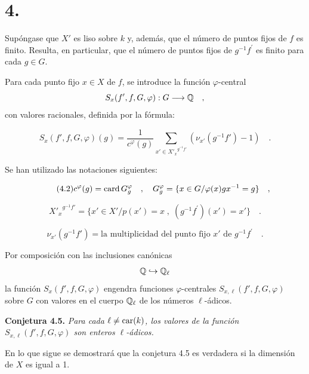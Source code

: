 \section*{4.}

Supóngase que $X'$ es liso sobre $k$ y, además, que el número de puntos fijos de $f$ es finito. Resulta, en particular, que el número de puntos fijos de $g^{-1}f^{\prime}$ es finito para cada $g \in G$.

Para cada punto fijo $x \in X$ de $f$, se introduce la función $\varphi$-central
\[
S_x(f',f,G,\varphi) : G \longrightarrow \mathbb Q \quad ,
\]
con valores racionales, definida por la fórmula:

\begin{equation}\tag{4.1}
S_x(f',f,G,\varphi)(g) = \frac{1}{c^\varphi(g)} \sum_{x' \in {X'_x}^{g^{-1}f'}} (\nu_{x'}(g^{-1}f') - 1) \quad .
\end{equation}

Se han utilizado las notaciones siguientes:

\begin{equation}\tag{4.2}
c^\varphi(g) = \operatorname{card} G_g^\varphi \quad , \quad G_g^\varphi = \{ x \in G / \varphi(x)gx^{-1} = g \} \quad ,
\end{equation}

\begin{equation}\tag{4.3}
{X'_x}^{g^{-1}f'} = \{ x' \in X' / p(x') = x \; , \; (g^{-1}f^{\prime})(x') = x' \} \quad .
\end{equation}

\begin{equation}\tag{4.4}
\nu_{x'}(g^{-1}f') = \text{la multiplicidad del punto fijo } x' \text{ de } g^{-1}f^{\prime} \quad .
\end{equation}

Por composición con las inclusiones canónicas
\[
\mathbb Q \hookrightarrow \mathbb Q_\ell
\]
la función $S_x(f',f,G,\varphi)$ engendra funciones $\varphi$-centrales $S_{x,\ell}(f',f,G,\varphi)$ sobre $G$ con valores en el cuerpo $\mathbb Q_\ell$ de los números $\ell$-ádicos.

\medskip
\noindent
\textbf{Conjetura 4.5.} \emph{Para cada $\ell \neq \operatorname{car}(k)$, los valores de la función $S_{x,\ell}(f',f,G,\varphi)$ son enteros $\ell$-ádicos.}

\medskip

En lo que sigue se demostrará que la conjetura 4.5 es verdadera si la dimensión de $X$ es igual a 1.
